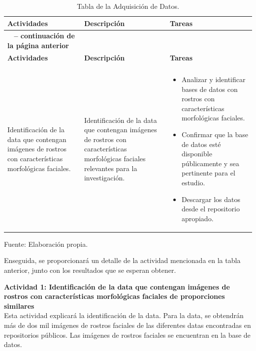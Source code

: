  \begin{longtable}{>{\raggedright\arraybackslash}p{4cm} >{\raggedright\arraybackslash}p{4cm} >{\raggedright\arraybackslash}p{5cm}}
    \caption{Tabla de la Adquisición de Datos.}
    \label{tabla:actividades}\\
    \hline
    \textbf{Actividades} & \textbf{Descripción} & \textbf{Tareas}\\
    \hline
    \endfirsthead

    \multicolumn{3}{c}%
    {{\bfseries \tablename\ \thetable{} -- continuación de la página anterior}} \\
    \hline
    \textbf{Actividades} & \textbf{Descripción} & \textbf{Tareas}\\
    \hline
    \endhead

    \hline
    \multicolumn{3}{r}{{Continúa en la siguiente página}} \\
    \endfoot

    \hline
    \endlastfoot

    Identificación de la data que contengan imágenes de rostros con características morfológicas faciales. & Identificación de la data que contengan imágenes de rostros con características morfológicas faciales relevantes para la investigación. & 
    \begin{itemize}
        \item Analizar y identificar bases de datos con rostros con características morfológicas faciales.
        \item Confirmar que la base de datos esté disponible públicamente y sea pertinente para el estudio.
        \item Descargar los datos desde el repositorio apropiado.
    \end{itemize} \\
\end{longtable}

\begin{flushleft}
    \small Fuente: Elaboración propia.
\end{flushleft}


Enseguida, se proporcionará un detalle de la actividad mencionada en la tabla anterior, junto con los resultados que se esperan obtener.
 
\textbf{Actividad 1: Identificación de la data que contengan imágenes de rostros con características morfológicas faciales de proporciones similares}
\\
Esta actividad explicará la identificación de la data. Para la data, se obtendrán más de dos mil imágenes de rostros faciales de las diferentes datas encontradas en repositorios públicos. Las imágenes de rostros faciales se encuentran en la base de datos. 
 
